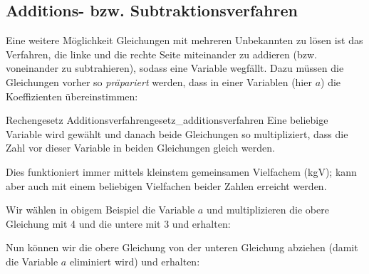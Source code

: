 
  
\subsection{Additions- bzw. Subtraktionsverfahren}
Eine weitere Möglichkeit Gleichungen mit mehreren Unbekannten zu lösen ist das Verfahren, die linke und die rechte Seite miteinander zu addieren (bzw. voneinander zu subtrahieren), sodass eine Variable wegfällt. Dazu müssen die Gleichungen vorher so \textit{präpariert} werden, dass in einer Variablen (hier \zB $a$) die Koeffizienten übereinstimmen:


  \begin{rezept}{Rechengesetz Additionsverfahren}{gesetz_additionsverfahren}
    Eine beliebige Variable wird gewählt und danach beide Gleichungen so multipliziert,
    dass die Zahl vor dieser Variable in beiden Gleichungen gleich werden.

    Dies funktioniert
    immer mittels kleinstem gemeinsamen Vielfachem (kgV); kann aber auch mit
    einem beliebigen Vielfachen beider Zahlen erreicht werden.
  \end{rezept}

Wir wählen \zB in obigem Beispiel die Variable $a$ und multiplizieren die obere Gleichung mit 4 und die untere mit 3 und
erhalten:



  Nun können wir die obere Gleichung von der unteren Gleichung abziehen (damit die Variable $a$ eliminiert wird)
und erhalten:
\newpage


